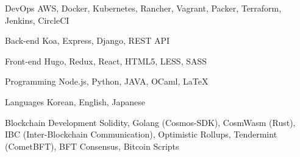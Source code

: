 

\begin{cvskills}

  \cvskill
    {DevOps} %
    {AWS, Docker, Kubernetes, Rancher, Vagrant, Packer, Terraform, Jenkins, CircleCI} %

  \cvskill
    {Back-end} %
    {Koa, Express, Django, REST API} %

  \cvskill
    {Front-end} %
    {Hugo, Redux, React, HTML5, LESS, SASS} %

  \cvskill
    {Programming} %
    {Node.js, Python, JAVA, OCaml, LaTeX} %

  \cvskill
    {Languages} %
    {Korean, English, Japanese} %

  \cvskill
    {Blockchain Development} %
    {Solidity, Golang (Cosmos-SDK), CosmWasm (Rust), IBC (Inter-Blockchain Communication), Optimistic Rollups, Tendermint (CometBFT), BFT Consensus, Bitcoin Scripts } %

\end{cvskills}
